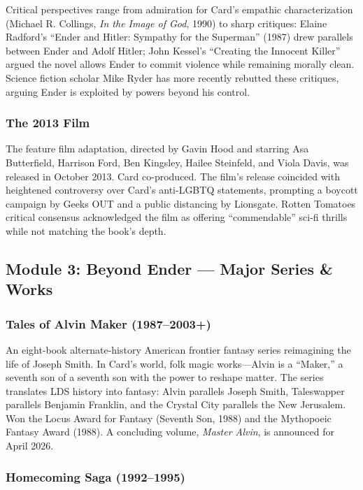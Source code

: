 \documentclass[11pt,letterpaper]{article}
\begin{document}
Critical perspectives range from admiration for Card's empathic characterization (Michael R. Collings, \textit{In the Image of God}, 1990) to sharp critiques: Elaine Radford's ``Ender and Hitler: Sympathy for the Superman'' (1987) drew parallels between Ender and Adolf Hitler; John Kessel's ``Creating the Innocent Killer'' argued the novel allows Ender to commit violence while remaining morally clean. Science fiction scholar Mike Ryder has more recently rebutted these critiques, arguing Ender is exploited by powers beyond his control.

\subsubsection{The 2013 Film}

The feature film adaptation, directed by Gavin Hood and starring Asa Butterfield, Harrison Ford, Ben Kingsley, Hailee Steinfeld, and Viola Davis, was released in October 2013. Card co-produced. The film's release coincided with heightened controversy over Card's anti-LGBTQ statements, prompting a boycott campaign by Geeks OUT and a public distancing by Lionsgate. Rotten Tomatoes critical consensus acknowledged the film as offering ``commendable'' sci-fi thrills while not matching the book's depth.

\subsection{Module 3: Beyond Ender --- Major Series \& Works}

\subsubsection{Tales of Alvin Maker (1987--2003+)}

An eight-book alternate-history American frontier fantasy series reimagining the life of Joseph Smith. In Card's world, folk magic works---Alvin is a ``Maker,'' a seventh son of a seventh son with the power to reshape matter. The series translates LDS history into fantasy: Alvin parallels Joseph Smith, Taleswapper parallels Benjamin Franklin, and the Crystal City parallels the New Jerusalem. Won the Locus Award for Fantasy (Seventh Son, 1988) and the Mythopoeic Fantasy Award (1988). A concluding volume, \textit{Master Alvin}, is announced for April 2026.

\subsubsection{Homecoming Saga (1992--1995)}
\end{document}
